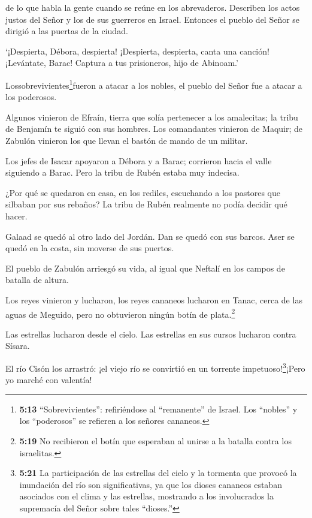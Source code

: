  de lo que habla la gente cuando se reúne en los
abrevaderos. Describen los actos justos del Señor y los de sus guerreros
en Israel. Entonces el pueblo del Señor se dirigió a las puertas de la
ciudad.

 `¡Despierta, Débora, despierta! ¡Despierta, despierta,
canta una canción! ¡Levántate, Barac! Captura a tus prisioneros, hijo de
Abinoam.'

 Lossobrevivientes\footnote{\textbf{5:13}
  ``Sobrevivientes'': refiriéndose al ``remanente'' de Israel. Los
  ``nobles'' y los ``poderosos'' se refieren a los señores cananeos.}fueron
a atacar a los nobles, el pueblo del Señor fue a atacar a los poderosos.

 Algunos vinieron de Efraín, tierra que solía pertenecer a
los amalecitas; la tribu de Benjamín te siguió con sus hombres. Los
comandantes vinieron de Maquir; de Zabulón vinieron los que llevan el
bastón de mando de un militar.

 Los jefes de Isacar apoyaron a Débora y a Barac; corrieron
hacia el valle siguiendo a Barac. Pero la tribu de Rubén estaba muy
indecisa.

 ¿Por qué se quedaron en casa, en los rediles, escuchando a
los pastores que silbaban por sus rebaños? La tribu de Rubén realmente
no podía decidir qué hacer.

 Galaad se quedó al otro lado del Jordán. Dan se quedó con
sus barcos. Aser se quedó en la costa, sin moverse de sus puertos.

 El pueblo de Zabulón arriesgó su vida, al igual que
Neftalí en los campos de batalla de altura.

 Los reyes vinieron y lucharon, los reyes cananeos lucharon
en Tanac, cerca de las aguas de Meguido, pero no obtuvieron ningún botín
de plata.\footnote{\textbf{5:19} No recibieron el botín que esperaban al
  unirse a la batalla contra los israelitas.}

 Las estrellas lucharon desde el cielo. Las estrellas en
sus cursos lucharon contra Sísara.

 El río Cisón los arrastró: ¡el viejo río se convirtió en
un torrente impetuoso!\footnote{\textbf{5:21} La participación de las
  estrellas del cielo y la tormenta que provocó la inundación del río
  son significativas, ya que los dioses cananeos estaban asociados con
  el clima y las estrellas, mostrando a los involucrados la supremacía
  del Señor sobre tales ``dioses.''}¡Pero yo marché con valentía!


